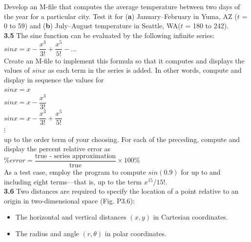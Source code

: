 \documentclass[../main.tex]{subfiles}
\begin{document}
\begin{multicols}{2}
    \noindent
    Develop an M-file that computes the average temperature
    between two days of the year for a particular city. Test it
    for (\textbf{a}) January--February in Yuma, AZ ($t$ = 0 to 59) and
    (\textbf{b}) July--August temperature in Seattle, WA($t$ = 180 to 242).\\

    \noindent\textbf{3.5} The sine function can be evaluated by the following
    infinite series:\\

    $sinx = x-\dfrac{x^3}{3!} + \dfrac{x^5}{5!} - \hdots$\\

    \noindent
    Create an M-file to implement this formula so that it computes
    and displays the values of $sin x$ as each term in the
    series is added. In other words, compute and display in
    sequence the values for\\

    $sinx = x$\\

    $sinx = x - \dfrac{x^3}{3!}$\\

    $sinx = x-\dfrac{x^3}{3!} + \dfrac{x^5}{5!}$\\

    \indent\indent$\vdots$\\

    \noindent
    up to the order term of your choosing. For each of the preceding,
    compute and display the percent relative error as\\

    $\%error = \dfrac{\text{true - series approximation}}{\text{true}}\times 100\%$\\

    \noindent
    As a test case, employ the program to compute $sin(0.9)$ for
    up to and including eight terms---that is, up to the term
    $x^{15}/15!$.\\

    \noindent\textbf{3.6} Two distances are required to specify the location of a
    point relative to an origin in two-dimensional space (Fig. P3.6):
    \begin{itemize}
        \item The horizontal and vertical distances $(x, y)$ in Cartesian
        coordinates.
        \item The radius and angle $(r, \theta)$ in polar coordinates.
    \end{itemize}


\end{multicols}
\end{document}
